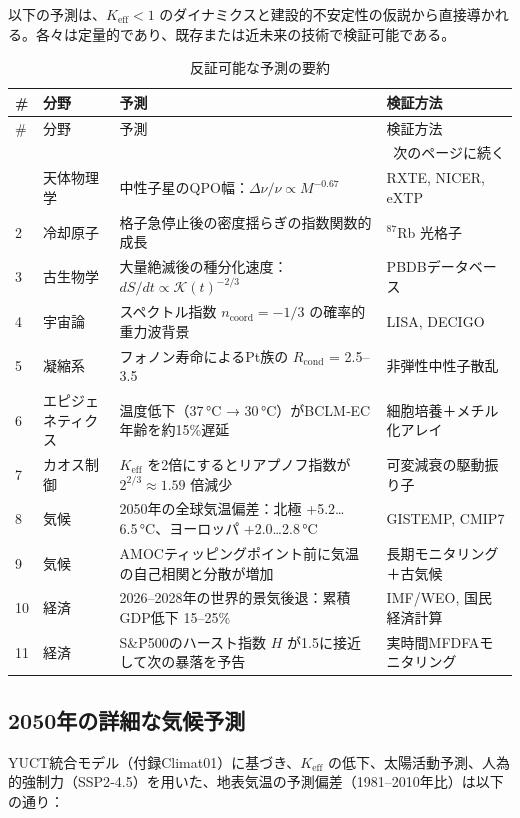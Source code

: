 \documentclass[12pt,a4paper]{article}
\newcommand{\Keff}{K_{\mathrm{eff}}}
\newcommand{\REL}{\mathcal{K}}
\begin{document}
	以下の予測は、\(\Keff < 1\) のダイナミクスと建設的不安定性の仮説から直接導かれる。各々は定量的であり、既存または近未来の技術で検証可能である。
	
	\begin{longtable}{|p{2cm}|p{3cm}|p{4.5cm}|p{4cm}|}
		\caption{反証可能な予測の要約}\label{tab:predictions}\\
		\hline
		\textbf{\#} & \textbf{分野} & \textbf{予測} & \textbf{検証方法} \\
		\hline
		\endfirsthead
		\hline
		\# & 分野 & 予測 & 検証方法 \\
		\hline
		\endhead
		\hline
		\multicolumn{4}{r}{次のページに続く} \\
		\endfoot
		\hline
		\endlastfoot
		1 & 天体物理学 & 中性子星のQPO幅：\(\Delta\nu/\nu \propto M^{-0.67}\) & RXTE, NICER, eXTP \\
		2 & 冷却原子 & 格子急停止後の密度揺らぎの指数関数的成長 & \({}^{87}\)Rb 光格子 \\
		3 & 古生物学 & 大量絶滅後の種分化速度：\(dS/dt \propto \REL(t)^{-2/3}\) & PBDBデータベース \\
		4 & 宇宙論 & スペクトル指数 \(n_{\mathrm{coord}} = -1/3\) の確率的重力波背景 & LISA, DECIGO \\
		5 & 凝縮系 & フォノン寿命によるPt族の \(R_{\text{cond}}\) = 2.5–3.5 & 非弾性中性子散乱 \\
		6 & エピジェネティクス & 温度低下（37 °C → 30 °C）がBCLM‑EC年齢を約15\%遅延 & 細胞培養＋メチル化アレイ \\
		7 & カオス制御 & \(\Keff\) を2倍にするとリアプノフ指数が \(2^{2/3} \approx 1.59\) 倍減少 & 可変減衰の駆動振り子 \\
		8 & 気候 & 2050年の全球気温偏差：北極 +5.2…6.5 °C、ヨーロッパ +2.0…2.8 °C & GISTEMP, CMIP7 \\
		9 & 気候 & AMOCティッピングポイント前に気温の自己相関と分散が増加 & 長期モニタリング＋古気候 \\
		10 & 経済 & 2026–2028年の世界的景気後退：累積GDP低下 15–25\% & IMF/WEO, 国民経済計算 \\
		11 & 経済 & S\&P500のハースト指数 \(H\) が1.5に接近して次の暴落を予告 & 実時間MFDFAモニタリング \\
	\end{longtable}
	
	\subsection{2050年の詳細な気候予測}
	
	YUCT統合モデル（付録Climat01）に基づき、\(\Keff\) の低下、太陽活動予測、人為的強制力（SSP2‑4.5）を用いた、地表気温の予測偏差（1981–2010年比）は以下の通り：
	
\end{document}
